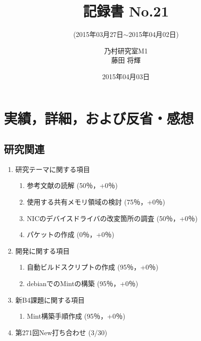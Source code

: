 \documentclass[fleqn, 14pt]{extarticle}
\subtitle{(2015年03月27日$\sim$2015年04月02日)}
\author{乃村研究室M1\\藤田 将輝}
\date{2015年04月03日}
\title{記録書 No.21}
\begin{document}
\maketitle
\section{実績，詳細，および反省・感想}
\subsection{研究関連}
\label{sec-2-1}
\begin{enumerate}
    \item 研究テーマに関する項目
    \hfill
    \label{enum-research1}
    \begin{enumerate}
        \item 参考文献の読解
        \hfill
        \label{enum-1-A}
        (50％，+0％)
        \item 使用する共有メモリ領域の検討
        \hfill
        \label{enum-1-B}
        (75％，+0％)
        \item NICのデバイスドライバの改変箇所の調査
        \hfill
        \label{enum-1-C}
        (50％，+0％)
        \item パケットの作成
            \hfill
            \label{enum-1-D}
            (0％，+0％)
    \end{enumerate}
    \item 開発に関する項目
    \hfill
    \label{enum-research2}
    \begin{enumerate}

        \item 自動ビルドスクリプトの作成
        \hfill
        \label{enum-2-A}
        (95％，+0％)
        \item debianでのMintの構築
        \hfill
        \label{enum-2-A}
        (95％，+0％)
    \end{enumerate}
    \item 新B4課題に関する項目
    \hfill
    \label{enum-research3}
    \begin{enumerate}
        \item Mint構築手順作成
        \hfill
        \label{enum-3-A}
        (95％，+0％)
        
    \end{enumerate}
    \item 第271回New打ち合わせ 
    \hfill
    \label{enum-research3}
    (3/30)

    \end{enumerate}
\end{document}
